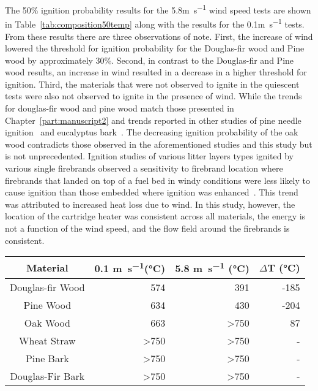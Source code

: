     The 50\% ignition probability results for the 5.8\si{\meter\per\second} wind speed tests are shown in Table~\ref{tab:composition50temp} along with the results for the 0.1\si{\meter\per\second} tests. From these results there are three observations of note. First, the increase of wind lowered the threshold for ignition probability for the Douglas-fir wood and Pine wood by approximately 30\%. Second, in contrast to the Douglas-fir and Pine wood results, an increase in wind resulted in a decrease in a higher threshold for ignition.  Third, the materials that were not observed to ignite in the quiescent tests were also not observed to ignite in the presence of wind. While the trends for douglas-fir wood and pine wood match those presented in Chapter~\ref{part:manuscript2} and trends reported in other studies of pine needle ignition~\cite{Wang2017} and eucalyptus bark~\cite{Ellis2011, Ellis2015}. The decreasing ignition probability of the oak wood contradicts those observed in the aforementioned studies and this study but is not unprecedented. Ignition studies of various litter layers types ignited by various single firebrands observed a sensitivity to firebrand location where firebrands that landed on top of a fuel bed in windy conditions were less likely to cause ignition than those embedded where ignition was enhanced~\cite{Plucinski2008}. This trend was attributed to increased heat loss due to wind. In this study, however, the location of the cartridge heater was consistent across all materials, the energy is not a function of the wind speed, and the flow field around the firebrands is consistent.  
    \begin{table*}[hpbt]
        \caption{Heater temperature required for 50\% probability of ignition for the materials and conditions tested.}
        \centering
        \begin{tabular}{crrr}
            Material & 0.1 \si{\meter\per\second}(\si{\celsius}) & 5.8 \si{\meter\per\second} (\si{\celsius}) & $\Delta$T (\si{\celsius})\\
            \hline
            Douglas-fir Wood & 574  & 391 & -185 \\
            Pine Wood        & 634  & 430 & -204\\
            Oak Wood         & 663  & \textgreater750 & 87\\
            Wheat Straw      & \textgreater750 & \textgreater750 & -\\
            Pine Bark        & \textgreater750 & \textgreater750 & -\\
            Douglas-Fir Bark & \textgreater750 & \textgreater750 & -
        \end{tabular}
        \label{tab:composition50temp}
    \end{table*}
    
